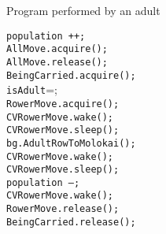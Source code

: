 \documentclass{article}
\begin{document}
\begin{spacing}{1.1}
\begin{algorithm}
\caption{Program performed by an adult}
\begin{algorithmic}[1]
  \STATE \texttt{population ++;}\\
  \STATE \texttt{AllMove.acquire();}\\
  \STATE \texttt{AllMove.release();}\\
  \STATE \texttt{BeingCarried.acquire();}\\
  \STATE \texttt{isAdult}=\TRUE;\\
  \STATE \texttt{RowerMove.acquire();}\\
  \STATE \texttt{CVRowerMove.wake();}\\
  \STATE \texttt{CVRowerMove.sleep();}\\
  \STATE \texttt{bg.AdultRowToMolokai();}\\
  \STATE \texttt{CVRowerMove.wake();}\\
  \STATE \texttt{CVRowerMove.sleep();}\\
  \STATE \texttt{population --;}\\
  \STATE \texttt{CVRowerMove.wake();}\\
  \STATE \texttt{RowerMove.release();}\\
  \STATE \texttt{BeingCarried.release();}\\
  \STATE \texttt{\RETURN}\\
\end{algorithmic}
\end{algorithm}



\end{spacing}
\end{document}
